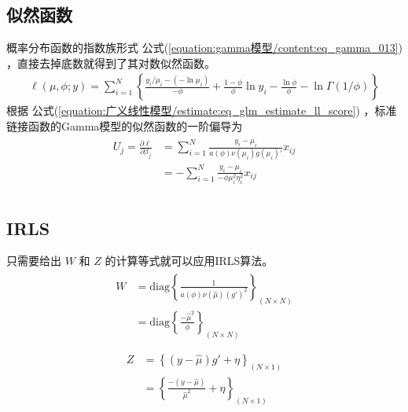 \documentclass[letterpaper,10pt,english]{sphinxmanual}
\begin{document}
\subsection{似然函数}
\label{\detokenize{gamma_u6a21_u578b/content:id5}}
概率分布函数的指数族形式 公式(\ref{equation:gamma模型/content:eq_gamma_013}) ，直接去掉底数就得到了其对数似然函数。
\begin{equation}\label{equation:gamma模型/content:gamma模型/content:12}
\begin{split}\ell(\mu,\phi;y) = \sum_{i=1}^N \left \{
\frac{y_i / \mu_i -(- \ln \mu_i)}{-\phi}
+ \frac{ 1-\phi}{\phi} \ln y_i
- \frac{\ln \phi}{ \phi }
- \ln \Gamma (1/ \phi)
\right \}\end{split}
\end{equation}
根据 公式(\ref{equation:广义线性模型/estimate:eq_glm_estimate_ll_score})
，标准链接函数的Gamma模型的似然函数的一阶偏导为
\begin{align}\label{equation:gamma模型/content:gamma模型/content:13}\!\begin{aligned}
U_j = \frac{\partial \ell}{\partial \beta_j}
&= \sum_{i=1}^N \frac{y_i-\mu_i}{a(\phi) \nu(\mu_i)g(\mu_i)' }  x_{ij}\\
&= - \sum_{i=1}^N \frac{y_i-\mu_i}{-\phi \mu_i^2 \eta_i^2 }  x_{ij}\\
\end{aligned}\end{align}

\subsection{IRLS}
\label{\detokenize{gamma_u6a21_u578b/content:irls}}
只需要给出 \(W\) 和 \(Z\) 的计算等式就可以应用IRLS算法。
\begin{align}\label{equation:gamma模型/content:gamma模型/content:14}\!\begin{aligned}
W &= \text{diag} \left \{ \frac{ 1}{ a(\phi) \nu(\hat{\mu}) ( g' )^2}
\right \}_{(N\times N)}\\
&= \text{diag} \left \{ \frac{ -\hat{\mu}^2}{ \phi}
\right \}_{(N\times N)}\\
\end{aligned}\end{align}\begin{align}\label{equation:gamma模型/content:gamma模型/content:15}\!\begin{aligned}
Z &=   \left \{ (y- \hat{\mu}) g'  + \eta
\right \}_{(N\times 1 )}\\
&=   \left \{ \frac{-(y- \hat{\mu})}{ \hat{\mu}^2}  + \eta
\right \}_{(N\times 1 )}\\
\end{aligned}\end{align}
\end{document}
